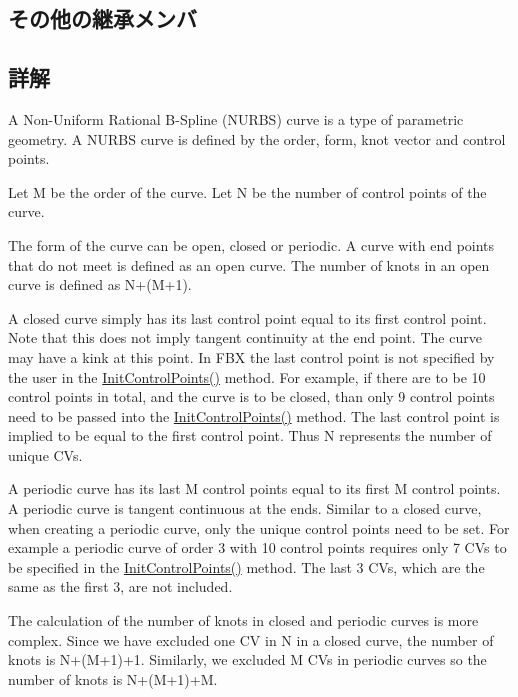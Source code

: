 \subsection*{その他の継承メンバ}


\subsection{詳解}
A Non-\/\+Uniform Rational B-\/\+Spline (N\+U\+R\+BS) curve is a type of parametric geometry. A N\+U\+R\+BS curve is defined by the order, form, knot vector and control points.

Let M be the order of the curve. Let N be the number of control points of the curve.

The form of the curve can be open, closed or periodic. A curve with end points that do not meet is defined as an open curve. The number of knots in an open curve is defined as N+(M+1).

A closed curve simply has its last control point equal to its first control point. Note that this does not imply tangent continuity at the end point. The curve may have a kink at this point. In F\+BX the last control point is not specified by the user in the \hyperlink{class_fbx_nurbs_curve_ac89cc4d5bf1bef1d88ee1b6e4b18be9b}{Init\+Control\+Points()} method. For example, if there are to be 10 control points in total, and the curve is to be closed, than only 9 control points need to be passed into the \hyperlink{class_fbx_nurbs_curve_ac89cc4d5bf1bef1d88ee1b6e4b18be9b}{Init\+Control\+Points()} method. The last control point is implied to be equal to the first control point. Thus N represents the number of unique C\+Vs.

A periodic curve has its last M control points equal to its first M control points. A periodic curve is tangent continuous at the ends. Similar to a closed curve, when creating a periodic curve, only the unique control points need to be set. For example a periodic curve of order 3 with 10 control points requires only 7 C\+Vs to be specified in the \hyperlink{class_fbx_nurbs_curve_ac89cc4d5bf1bef1d88ee1b6e4b18be9b}{Init\+Control\+Points()} method. The last 3 C\+Vs, which are the same as the first 3, are not included.

The calculation of the number of knots in closed and periodic curves is more complex. Since we have excluded one CV in N in a closed curve, the number of knots is N+(M+1)+1. Similarly, we excluded M C\+Vs in periodic curves so the number of knots is N+(M+1)+M.

